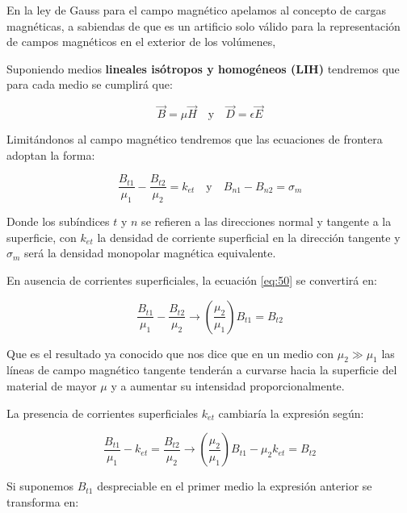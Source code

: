 En la ley de Gauss para el campo magnético apelamos al concepto de cargas magnéticas, a sabiendas de que es un artificio solo válido para la representación de campos magnéticos en el exterior de los volúmenes, 

Suponiendo medios \textbf{lineales isótropos y homogéneos (LIH)} tendremos que para cada medio se cumplirá que:

\begin{equation}
	\overrightarrow{B}=\mu \overrightarrow{H} \quad \text{y} \quad \overrightarrow{D}= \epsilon \overrightarrow{E}
\end{equation}

Limitándonos al campo magnético tendremos que las ecuaciones de frontera adoptan la forma:

\begin{equation}
	\label{eq:50}
	\dfrac{B_{t1}}{\mu_{1}} -\dfrac{B_{t2}}{\mu_{2}} =k_{et} \quad \text{y} \quad B_{n1}-B_{n2} =  \sigma_{m} 
\end{equation}

Donde los subíndices $t$ y $n$ se refieren a las direcciones normal y tangente a la superficie, con $k_{et}$ la densidad de corriente superficial en la dirección tangente y $\sigma_{m}$ será la densidad monopolar magnética equivalente.

En ausencia de corrientes superficiales, la ecuación \ref{eq:50} se convertirá en:

\begin{equation}
	\label{eq:51}
	\dfrac{B_{t1}}{\mu_{1}} -\dfrac{B_{t2}}{\mu_{2}} \rightarrow \left( \dfrac{\mu_{2}}{\mu_{1}}\right)  B_{t1}= B_{t2}
\end{equation}

Que es el resultado ya conocido que nos dice que en un medio con $\mu_{2}\gg\mu_{1}$ las líneas de campo magnético tangente tenderán a curvarse hacia la superficie del material de mayor $\mu$ y a aumentar su intensidad proporcionalmente.

La presencia de corrientes superficiales $k_{et}$ cambiaría la expresión según:

\begin{equation}
	\label{eq:52}
	\dfrac{B_{t1}}{\mu_{1}} - k_{et} = \dfrac{B_{t2}}{\mu_{2}} \rightarrow \left( \dfrac{\mu_{2}}{\mu_{1}}\right) B_{t1} - \mu_{2} k_{et} = B_{t2}
\end{equation}

Si suponemos $B_{t1}$ despreciable en el primer medio la expresión anterior se transforma en:

